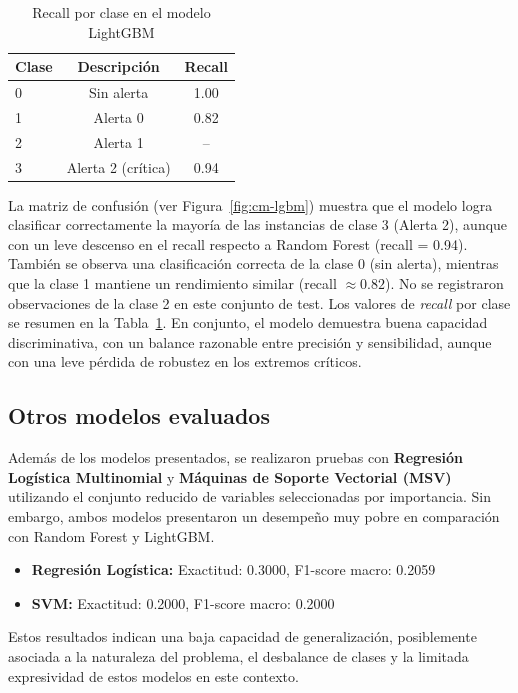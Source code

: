 \documentclass[11pt]{report}
\begin{document}
\begin{table}[H]
\centering
\caption{Recall por clase en el modelo LightGBM}
\label{tab:recall-lgbm}
\begin{tabular}{lcc}
\toprule
\textbf{Clase} & \textbf{Descripción} & \textbf{Recall} \\
\midrule
0 & Sin alerta           & 1.00 \\
1 & Alerta 0             & 0.82 \\
2 & Alerta 1             & -- \\
3 & Alerta 2 (crítica)   & 0.94 \\
\bottomrule
\end{tabular}
\end{table}

La matriz de confusión (ver Figura~\ref{fig:cm-lgbm}) muestra que el modelo logra clasificar correctamente la mayoría de las instancias de clase 3 (Alerta 2), aunque con un leve descenso en el recall respecto a Random Forest (recall = 0.94). También se observa una clasificación correcta de la clase 0 (sin alerta), mientras que la clase 1 mantiene un rendimiento similar (recall $\approx 0.82$). No se registraron observaciones de la clase 2 en este conjunto de test. Los valores de \textit{recall} por clase se resumen en la Tabla~\ref{tab:recall-lgbm}. En conjunto, el modelo demuestra buena capacidad discriminativa, con un balance razonable entre precisión y sensibilidad, aunque con una leve pérdida de robustez en los extremos críticos.


\subsection{Otros modelos evaluados}

Además de los modelos presentados, se realizaron pruebas con \textbf{Regresión Logística Multinomial} y \textbf{Máquinas de Soporte Vectorial (MSV)} utilizando el conjunto reducido de variables seleccionadas por importancia. Sin embargo, ambos modelos presentaron un desempeño muy pobre en comparación con Random Forest y LightGBM.

\begin{itemize}[noitemsep]
  \item \textbf{Regresión Logística:} Exactitud: 0.3000, F1-score macro: 0.2059
  \item \textbf{SVM:} Exactitud: 0.2000, F1-score macro: 0.2000
\end{itemize}

Estos resultados indican una baja capacidad de generalización, posiblemente asociada a la naturaleza del problema, el desbalance de clases y la limitada expresividad de estos modelos en este contexto.
\end{document}
